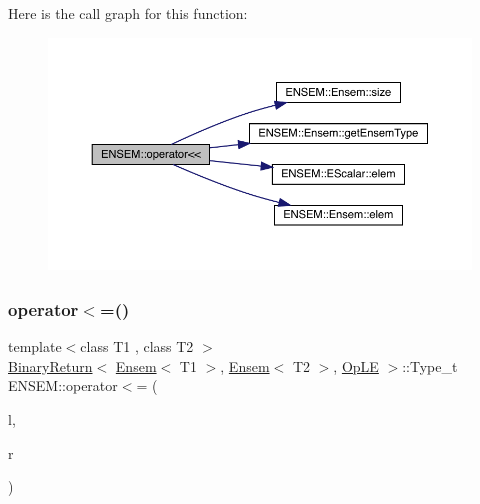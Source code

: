 Here is the call graph for this function\+:\nopagebreak
\begin{figure}[H]
\begin{center}
\leavevmode
\includegraphics[width=350pt]{d1/d9e/group__eensem_ga8276aea8565989d936393895688a0a95_cgraph}
\end{center}
\end{figure}
\mbox{\label{group__eensem_ga2a70dca80960fd84a701d582cced7d40}} 
\subsubsection{\texorpdfstring{operator$<$=()}{operator<=()}\hspace{0.1cm}{\footnotesize\ttfamily [1/3]}}
{\footnotesize\ttfamily template$<$class T1 , class T2 $>$ \\
\mbox{\hyperlink{structENSEM_1_1BinaryReturn}{Binary\+Return}}$<$ \mbox{\hyperlink{classENSEM_1_1Ensem}{Ensem}}$<$ T1 $>$, \mbox{\hyperlink{classENSEM_1_1Ensem}{Ensem}}$<$ T2 $>$, \mbox{\hyperlink{structENSEM_1_1OpLE}{Op\+LE}} $>$\+::Type\+\_\+t E\+N\+S\+E\+M\+::operator$<$= (\begin{DoxyParamCaption}\item[{const \mbox{\hyperlink{classENSEM_1_1Ensem}{Ensem}}$<$ T1 $>$ \&}]{l,  }\item[{const \mbox{\hyperlink{classENSEM_1_1Ensem}{Ensem}}$<$ T2 $>$ \&}]{r }\end{DoxyParamCaption})\hspace{0.3cm}{\ttfamily [inline]}}

